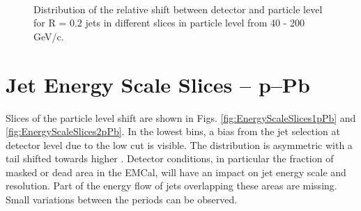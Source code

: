 \begin{figure}[h!]
    \qquad
    \\
    \qquad
    \caption{Distribution of the relative \pT shift between detector and particle level \pT for R = 0.2 jets in different slices in particle level \pT from 40 - 200 GeV/c.}
    \label{fig:EnergyScaleSlices2}
\end{figure}

\newpage

\section{Jet Energy Scale Slices -- p--Pb}
\label{sec:AppendixJESpPb}

Slices of the particle level \pT shift are shown in Figs. \ref{fig:EnergyScaleSlices1pPb} and \ref{fig:EnergyScaleSlices2pPb}. In the lowest bins, a bias from the jet selection at detector level due to the low \pT cut is visible. The distribution is asymmetric with a tail shifted towards higher \pT. Detector conditions, in particular the fraction of masked or dead area in the EMCal, will have an impact on jet energy scale and resolution. Part of the energy flow of jets overlapping these areas are missing. Small variations between the periods can be observed.

